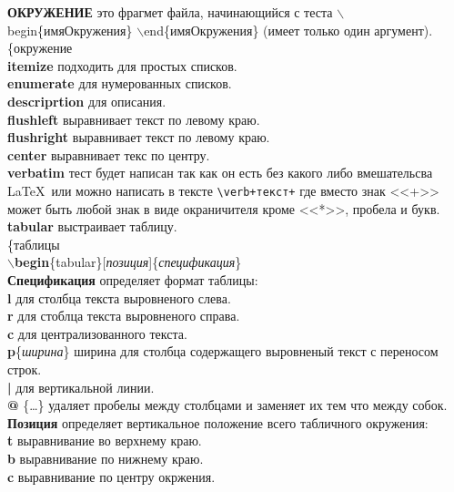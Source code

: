 \documentclass{article}
\newcommand{\bb}[1]{{\bfseries $\backslash$#1}} %
\begin{document}
{\bfseries ОКРУЖЕНИЕ} это фрагмет файла, начинающийся с теста   $\backslash$begin\{имяОкружения\} $\backslash$end\{имяОкружения\} (имеет только один аргумент).\\
\{окружение\\ 
{\bfseries itemize} подходить для простых списков.\\
{\bfseries enumerate} для нумерованных списков.\\
{\bfseries descriprtion} для описания.\\
{\bfseries flushleft} выравнивает текст по левому краю.\\
{\bfseries flushright} выравнивает текст по левому краю.\\
{\bfseries center} выравнивает текс по центру.\\
{\bfseries verbatim} тест будет написан так как он есть без какого либо вмешательсва \LaTeX~или можно написать в тексте \verb|\verb+текст+| где вместо знак <<+>> может быть любой знак в виде окраничителя кроме <<*>>, пробела и букв.\\

{\bfseries tabular} выстраивает таблицу.\\
\{таблицы \\

\bb{begin}\{tabular\}[\emph{позиция}]\{\emph{спецификация}\}\\ 

{\bfseries Спецификация} определяет формат таблицы:\\ 
{\bfseries l} для столбца текста выровненого слева.\\ 
{\bfseries r} для стоблца текста выровненого справа.\\
{\bfseries c} для централизованного текста.\\
{\bfseries p}\{\emph{ширина}\} ширина для столбца содержащего выровненый текст с переносом строк.\\
{\bfseries |} для вертикальной линии.\\ 
{\bfseries @} \{\ldots\} удаляет пробелы между столбцами и заменяет их тем что между собок.\\

{\bfseries Позиция} определяет вертикальное положение всего табличного окружения:\\
{\bfseries t} выравнивание во верхнему краю.\\
{\bfseries b} выравнивание по нижнему краю.\\
{\bfseries c} выравнивание по центру окржения.\\ 
\end{document}
